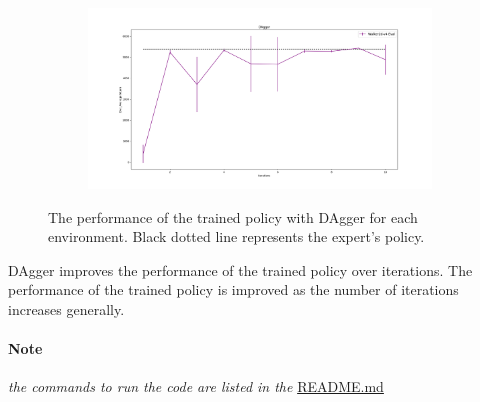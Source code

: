 \documentclass{article}%
\begin{document}
\begin{figure}[h]
\begin{subfigure}{0.48\textwidth}
	\end{subfigure}
	\begin{subfigure}{0.48\textwidth}
			\includegraphics[width=\textwidth]{hw1_4_walker2d-v4.png}
	\end{subfigure}
	\caption{The performance of the trained policy with DAgger for each environment. Black dotted line represents the expert's policy.}
\end{figure}

DAgger improves the performance of the trained policy over iterations. The performance of the trained policy is improved as the number of iterations increases generally. 

\paragraph*{Note}
\textit{the commands to run the code are listed in the }\href{https://github.com/ChanJoon/CS285_hw_fall2023/tree/main/hw1/README.md}{README.md}
\end{document}
